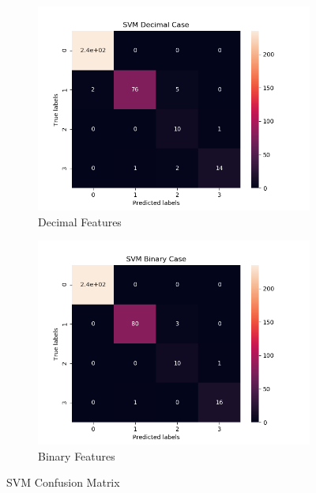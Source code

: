 \begin{figure}[H]
     \centering
    
     \begin{subfigure}[b]{0.48\textwidth}
         \centering
         \includegraphics[width=\textwidth]{../Figures/SVM Decimal Case_conf_mat.png}
         \caption{Decimal Features}
     \end{subfigure}
     \hfill
     \begin{subfigure}[b]{0.48\textwidth}
         \centering
         \includegraphics[width=\textwidth]{../Figures/SVM Binary Case_conf_mat.png}
         \caption{Binary Features}
     \end{subfigure}
     \caption{SVM Confusion Matrix}
\end{figure}